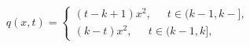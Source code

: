 \documentclass[a4paper,10pt]{article}
\title{}
\author{}
\begin{document}
\maketitle

\begin{abstract}
\end{abstract}


\[
q(x,t)=
\begin{cases}(t-k+1)x^2,\quad \ \
  t\in\big(k-1,k-\big],\\
  (k-t)x^2, \quad \ \  t\in\big(k-1,k\big],
\end{cases}
\]
\end{document}
